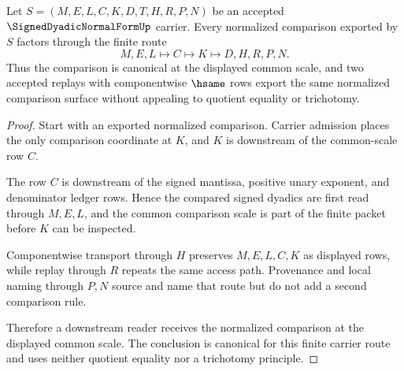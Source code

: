 \begin{theorem}
\label{thm:signed-dyadic-normal-form-common-scale-canonicality}
Let $S=(M,E,L,C,K,D,T,H,R,P,N)$ be an accepted $\SignedDyadicNormalFormUp$ carrier. Every normalized comparison exported by $S$ factors through the finite route
$$
M,E,L \longmapsto C \longmapsto K \longmapsto D,H,R,P,N .
$$
Thus the comparison is canonical at the displayed common scale, and two accepted replays with componentwise $\hsame$ rows export the same normalized comparison surface without appealing to quotient equality or trichotomy.
\end{theorem}
\begin{proof}
Start with an exported normalized comparison. Carrier admission places the only comparison coordinate at $K$, and $K$ is downstream of the common-scale row $C$.

The row $C$ is downstream of the signed mantissa, positive unary exponent, and denominator ledger rows. Hence the compared signed dyadics are first read through $M,E,L$, and the common comparison scale is part of the finite packet before $K$ can be inspected.

Componentwise transport through $H$ preserves $M,E,L,C,K$ as displayed rows, while replay through $R$ repeats the same access path. Provenance and local naming through $P,N$ source and name that route but do not add a second comparison rule.

Therefore a downstream reader receives the normalized comparison at the displayed common scale. The conclusion is canonical for this finite carrier route and uses neither quotient equality nor a trichotomy principle.
\end{proof}

